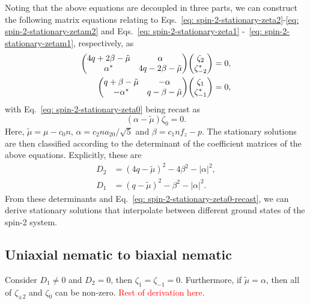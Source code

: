 Noting that the above equations are decoupled in three parts, we can construct
the following matrix equations relating to
Eqs.~\eqref{eq: spin-2-stationary-zeta2}-\eqref{eq: spin-2-stationary-zetam2}
and Eqs.~\eqref{eq: spin-2-stationary-zeta1}
-~\eqref{eq: spin-2-stationary-zetam1}, respectively, as
\begin{align}
    \mqty(4q + 2\beta -\tilde{\mu} & \alpha                           \\
    \alpha^*                       & 4q - 2\beta -\tilde{\mu})
    \mqty(\zeta_2                                                     \\
    \zeta_{-2}^*)                  & = 0, \label{eq: zeta-pm2-matrix} \\
    \mqty(q + \beta -\tilde{\mu}   & -\alpha                          \\
    -\alpha^*                      & q - \beta -\tilde{\mu})
    \mqty(\zeta_1                                                     \\
    \zeta_{-1}^*)                  & = 0, \label{eq: zeta-pm1-matrix}
\end{align}
with Eq.~\eqref{eq: spin-2-stationary-zeta0} being recast as
\begin{equation}\label{eq: spin-2-stationary-zeta0-recast}
    (\alpha - \tilde{\mu})\zeta_0 = 0.
\end{equation}
Here, \(\tilde{\mu} = \mu - c_0n\), \(\alpha = c_2na_{20}/\sqrt{5}\) and
\(\beta = c_1nf_z - p\).
The stationary solutions are then classified according to the determinant of
the coefficient matrices of the above equations.
Explicitly, these are
\begin{align}
    D_2 & = {(4q-\tilde{\mu})}^2 -4\beta^2 - |\alpha|^2, \label{eq: D2}  \\
    D_1 & = {(q - \tilde{\mu})}^2 - \beta^2 - |\alpha|^2. \label{eq: D1}
\end{align}
From these determinants and Eq.~\eqref{eq: spin-2-stationary-zeta0-recast},
we can derive stationary solutions that interpolate between different ground
states of the spin-2 system.

\subsection{Uniaxial nematic to biaxial nematic}\label{subsec: UN-BN-defects}
Consider \(D_1 \neq 0\) and \(D_2 = 0\), then \(\zeta_1 = \zeta_{-1} = 0\).
Furthermore, if \(\tilde{\mu} = \alpha \), then all of \(\zeta_{\pm 2}\) and
\(\zeta_0\) can be non-zero.
\textcolor{red}{Rest of derivation here.}

